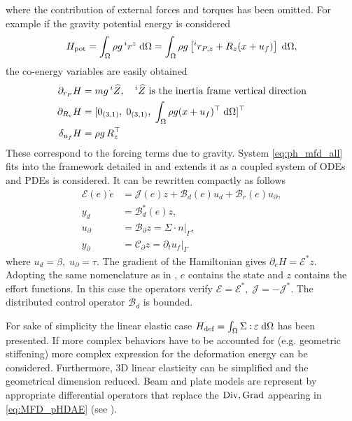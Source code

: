 where the contribution of external forces and torques has been omitted. For example if the gravity potential energy is considered
\begin{equation*}
	H_{\text{pot}} = \int_{\Omega} \rho g \, ^i r^z \d{\Omega} = \int_{\Omega} \rho g \left[ ^i r_{P, z} +R_z (x + u_f) \right] \d{\Omega},
\end{equation*}
the co-energy variables are easily obtained
\begin{align*}
\partial_{r_P}H &= m g \, ^i \widehat{Z}, \quad \text{$^i \widehat{Z}$ is the inertia frame vertical direction}\\
\partial_{R_\text{v}}H &= [0_{(3, 1)}, \; 0_{(3, 1)}, \; \int_{\Omega} \rho g (x + u_f)^\top \d{\Omega}]^\top \\
\delta_{u_f} H &= \rho g \, R_z^\top
\end{align*}
These correspond to the forcing terms due to gravity. System \eqref{eq:ph_mfd_all} fits into the framework detailed in \cite{mehrmann2019structurepreserving} and extends it as a coupled system of ODEs and PDEs is considered. It can be rewritten compactly as follows
\begin{equation}
\label{eq:MFD_pHDAE}
\begin{aligned}
\mathcal{E}(e) \dot{e} &= \mathcal{J}(e) z + \mathcal{B}_d(e) u_d + \mathcal{B}_r(e) u_\partial, \\
y_d &= \mathcal{B}_d^*(e) z, \\
u_\partial &= \mathcal{B}_{\partial} z =  \Sigma \cdot n|_{\Gamma}, \\
y_\partial &= \mathcal{C}_{\partial} z = \partial_t u_f|_{\Gamma}
\end{aligned}
\end{equation}
where $u_d = \beta, \; u_\partial = \tau$. The gradient of the Hamiltonian  gives $\partial_e H = \mathcal{E}^* z$. Adopting the same nomenclature as in \cite{mehrmann2019structurepreserving}, $e$ contains the state and $z$ contains the effort functions. In this case the operators verify $\mathcal{E} = \mathcal{E}^*, \; \mathcal{J} = -\mathcal{J}^*$. The distributed control operator $\mathcal{B}_d$ is bounded. 

\begin{remark}
For sake of simplicity the linear elastic case $H_{\text{def}}=\int_{\Omega} \Sigma \cddot \varepsilon \d{\Omega}$ has been presented. If more complex behaviors have to be accounted for (e.g. geometric stiffening) more complex expression for the deformation energy can be considered. Furthermore, 3D linear elasticity can be simplified and the geometrical dimension reduced. Beam and plate models are represent by appropriate differential operators that replace the $\operatorname*{Div}, \operatorname*{Grad}$ appearing in \eqref{eq:MFD_pHDAE} (see ).
\end{remark}

